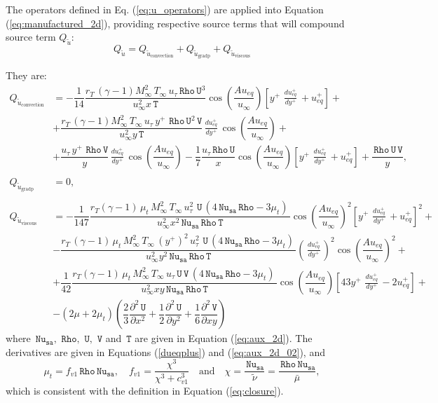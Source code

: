 \documentclass[10pt]{article}
\newcommand{\diff}[2] {\dfrac{\partial #1}{\partial #2}}
\newcommand{\Rho}{\,\mathtt{Rho}}
\newcommand{\U}{\,\mathtt{U}}
\newcommand{\V}{\,\mathtt{V}}
\newcommand{\Nu}{\,\mathtt{Nu_{sa}}}
\newcommand{\T}{\,\mathtt{T}}
\newcommand{\Dueqplusyplus}{\, \frac{du_{eq}^+}{dy^+}\,}
\newcommand{\tu}{\tilde{u}}
\newcommand{\bmu}{\bar{\mu}}
\begin{document}
The operators defined in Eq. (\ref{eq:u_operators}) are applied into Equation (\ref{eq:manufactured_2d}), providing respective source terms that will compound source term $Q_{\tu}$:
\begin{equation*}
Q_{\tu}	=Q_{\tu_\text{convection}} + Q_{\tu_\text{gradp}}+Q_{\tu_\text{viscous}}
\end{equation*}

They are:
\begin{equation}
 \begin{split}
Q_{\tu_\text{convection}}&= -\dfrac{1}{14} \dfrac{r_T \, (\gamma-1)  M_{\infty}^2 \, T_{\infty} \,  u_{\tau} \Rho \U^3}{u_{\infty}^2 x \T} \cos\left(\dfrac{A u_{eq}}{u_{\infty}}\right)\left[y^{+} \, \Dueqplusyplus+u_{eq}^{+} \right]+\\
%
&+\dfrac{r_T \, (\gamma-1) M_{\infty}^2 \, T_{\infty} \,   u_{\tau} \,  y^{+} \,\Rho \U^2 \V}{u_{\infty}^2 y \T} \Dueqplusyplus  \cos\left(\dfrac{A u_{eq}}{u_{\infty}}\right)+\\
%
&+\dfrac{ u_{\tau} \,  y^{+} \, \Rho \V }{y} \Dueqplusyplus \cos\left(\dfrac{A u_{eq}}{u_{\infty}}\right)-\dfrac{1}{7} \dfrac{u_{\tau} \Rho \U}{x}\cos\left(\dfrac{A u_{eq}}{u_{\infty}}\right)\left[y^{+} \, \Dueqplusyplus+u_{eq}^{+} \right]  +\dfrac{\Rho \U \V}{y} ,\\ 
&\\
Q_{\tu_\text{gradp}} &= 0 , \\
%
&\\
Q_{\tu_\text{viscous}} &=-\dfrac{1}{147} \dfrac{r_T(\gamma-1) \,  \mu_t  \, M_{\infty}^2 \, T_{\infty} \,  u_{\tau}^2 \, \U \, (4 \Nu \Rho-3 \mu_t) \, }{u_{\infty}^2 x^2 \Nu \Rho \T} \cos\left(\dfrac{A u_{eq}}{u_{\infty}}\right)^2 \left[y^{+} \, \Dueqplusyplus+u_{eq}^{+} \right]^2+\\
%
&-\dfrac{r_T \, (\gamma-1) \,  \mu_t \, M_{\infty}^2 \, T_{\infty} \,  (y^{+})^2 \,  u_{\tau}^2 \, \U \, (4 \Nu \Rho-3 \mu_t) \,}{u_{\infty}^2 y^2 \Nu \Rho \T} \left(\Dueqplusyplus\right)^2  \cos\left(\dfrac{A u_{eq}}{u_{\infty}}\right)^2+\\
%
&+\dfrac{1}{42} \dfrac{  r_T(\gamma-1) \,  \mu_t  \, M_{\infty}^2 \, T_{\infty} \,  u_{\tau} \U \V \, (4 \Nu \Rho-3 \mu_t) \,}{u_{\infty}^2 x y \Nu \Rho \T} \cos\left(\dfrac{A u_{eq}}{u_{\infty}}\right)\left[43 y^{+} \, \Dueqplusyplus-2 u_{eq}^{+}\right]+\\
%
&-(2 \mu + 2 \mu_t) \left(\dfrac{2}{3} \diff{^2 \U}{x^2}+\dfrac{1}{2}  \diff{^2 \U}{y^2} +\dfrac{1}{6} \diff{^2 \V}{xy}\right)
 \end{split}
\end{equation}
where  $\Nu,\, \Rho,\,\U,\,\V$ and $\T$ are given in Equation (\ref{eq:aux_2d}). The derivatives are given in Equations (\ref{dueqplus}) and (\ref{eq:aux_2d_02}), and
\begin{equation}\label{eq:mu_t}
  \mu_t= f_{v1} \Rho \Nu,\quad f_{v1} = \dfrac{\chi^3}{\chi^3+c_{v1}^3}\quad \mbox{and}\quad \chi =\dfrac{\Nu}{\tilde{\nu}} =\dfrac{\Rho \Nu}{\bmu},
\end{equation}
which is consistent with the definition in Equation (\ref{eq:closure}).
\end{document}
